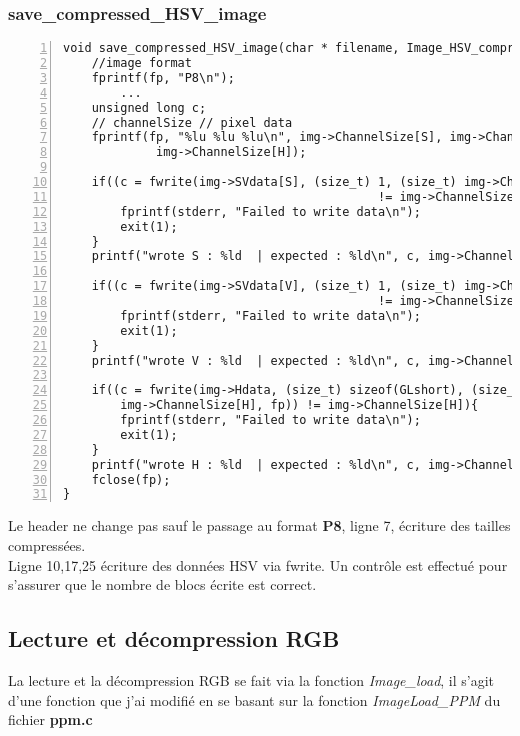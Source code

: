 \documentclass[12pt, letterpaper]{article}
\begin{document}
\subsubsection{save\_compressed\_HSV\_image}
\begin{Verbatim}[numbers=left,xleftmargin = 5mm]
void save_compressed_HSV_image(char * filename, Image_HSV_compressed * img){
    //image format
    fprintf(fp, "P8\n");
        ...
    unsigned long c;
    // channelSize // pixel data
    fprintf(fp, "%lu %lu %lu\n", img->ChannelSize[S], img->ChannelSize[V],
             img->ChannelSize[H]);
    
    if((c = fwrite(img->SVdata[S], (size_t) 1, (size_t) img->ChannelSize[S], fp)) 
                                            != img->ChannelSize[S]){
        fprintf(stderr, "Failed to write data\n");
        exit(1);
    }
    printf("wrote S : %ld  | expected : %ld\n", c, img->ChannelSize[S]);
    
    if((c = fwrite(img->SVdata[V], (size_t) 1, (size_t) img->ChannelSize[V], fp)) 
                                            != img->ChannelSize[V]){
        fprintf(stderr, "Failed to write data\n");
        exit(1);
    }
    printf("wrote V : %ld  | expected : %ld\n", c, img->ChannelSize[V]);
    
    if((c = fwrite(img->Hdata, (size_t) sizeof(GLshort), (size_t) 
        img->ChannelSize[H], fp)) != img->ChannelSize[H]){
        fprintf(stderr, "Failed to write data\n");
        exit(1);
    }
    printf("wrote H : %ld  | expected : %ld\n", c, img->ChannelSize[H]);
    fclose(fp);
}
\end{Verbatim}
Le header ne change pas sauf le passage au format \textbf{P8}, ligne 7, écriture des tailles compressées.\\
Ligne 10,17,25 écriture des données HSV via fwrite. Un contrôle est effectué pour s'assurer que le nombre de blocs écrite est correct.

\subsection{Lecture et décompression RGB}
La lecture et la décompression RGB se fait via la fonction \textit{Image\_load}, il s'agit d'une fonction que j'ai modifié en se basant sur la 
fonction \textit{ImageLoad\_PPM} du fichier \textbf{ppm.c}
\end{document}
